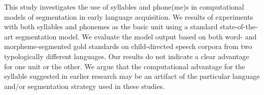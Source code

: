 This study investigates the use of syllables and phone(me)s in computational models of segmentation in early language acquisition. We results of experiments with both syllables and phonemes as the basic unit using a standard state-of-the-art segmentation model. We evaluate the model output based on both word- and morpheme-segmented gold standards on child-directed speech corpora from two typologically different languages. Our results do not indicate a clear advantage for one unit or the other. We argue that the computational advantage for the syllable suggested in earlier research may be an artifact of the particular language and/or segmentation strategy used in these studies.
